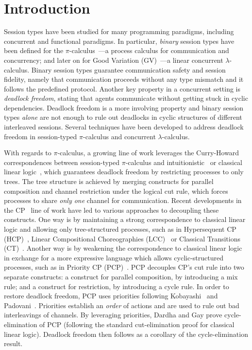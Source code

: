 \documentclass[main.tex]{subfiles}
\begin{document}
\section{Introduction}
Session types have been studied for many programming paradigms, including concurrent and functional paradigms. In particular, \emph{binary} session types have been defined for the $\pi$-calculus~\cite{honda93,takeuchihonda94,hondavasconcelos98}---a process calculus for communication and concurrency; and later on for Good Variation (GV)~\cite{wadler15,lindleymorris15}---a linear concurrent $\lambda$-calculus.
Binary session types guarantee communication safety and session fidelity, namely that communication proceeds without any type mismatch and it follows the predefined protocol.
Another key property in a concurrent setting is \emph{deadlock freedom}, stating that agents communicate without getting stuck in cyclic dependencies. Deadlock freedom is a more involving property and binary session types \emph{alone} are not enough to rule out deadlocks in cyclic structures of different interleaved sessions. Several techniques have been developed to address deadlock freedom in session-typed $\pi$-calculus and concurrent $\lambda$-calculus.

With regards to $\pi$-calculus, a growing line of work leverages the Curry-Howard correspondences between session-typed $\pi$-calculus and intuitionistic~\cite{cairespfenning10} or classical linear logic~\cite{wadler14}, which guarantees deadlock freedom by restricting processes to only trees. The tree structure is achieved by merging constructs for parallel composition and channel restriction under the logical cut rule, which forces processes to share \emph{only one} channel for communication.
Recent developments in the CP~\cite{wadler14} line of work have led to various approaches to decoupling these constructs. One way is by maintaining a strong correspondence to classical linear logic and allowing only tree-structured processes, such as in Hypersequent CP (HCP)~\cite{kokkemontesi19popl,kokkemontesi19tlla}, Linear Compositional Choreographies (LCC)~\cite{CarboneMS18} or Classical Transitions (CT)~\cite{MP18}. Another way is by weakening the correspondence to classical linear logic in exchange for a more expressive language which allows cyclic-structured processes, such as in Priority CP (PCP)~\cite{dardhagay18}. PCP decouples CP's cut rule into two separate constructs: a construct for parallel composition, by introducing a mix rule; and a construct for restriction, by introducing a cycle rule. In order to restore deadlock freedom, PCP uses priorities following Kobayashi~\cite{kobayashi06} and Padovani~\cite{padovani14}. Priorities establish an \emph{order} of actions and are used to rule out bad interleavings of channels. By leveraging priorities, Dardha and Gay prove cycle-elimination of PCP (following the standard cut-elimination proof for classical linear logic). Deadlock freedom then follows as a corollary of the cycle-elimination result.
\end{document}
